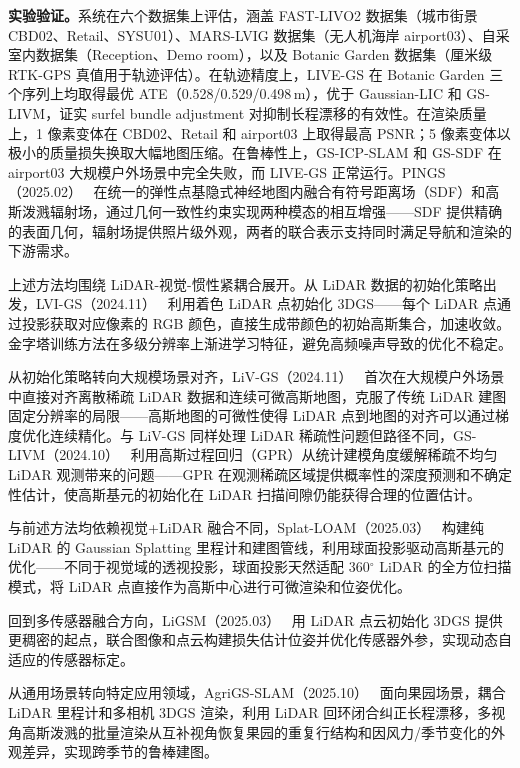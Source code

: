 \textbf{实验验证。}系统在六个数据集上评估，涵盖 FAST-LIVO2 数据集（城市街景 CBD02、Retail、SYSU01）、MARS-LVIG 数据集（无人机海岸 airport03）、自采室内数据集（Reception、Demo room），以及 Botanic Garden 数据集（厘米级 RTK-GPS 真值用于轨迹评估）。在轨迹精度上，LIVE-GS 在 Botanic Garden 三个序列上均取得最优 ATE（0.528/0.529/0.498\,m），优于 Gaussian-LIC 和 GS-LIVM，证实 surfel bundle adjustment 对抑制长程漂移的有效性。在渲染质量上，1 像素变体在 CBD02、Retail 和 airport03 上取得最高 PSNR；5 像素变体以极小的质量损失换取大幅地图压缩。在鲁棒性上，GS-ICP-SLAM 和 GS-SDF 在 airport03 大规模户外场景中完全失败，而 LIVE-GS 正常运行。PINGS（2025.02）~\cite{2502_05752} 在统一的弹性点基隐式神经地图内融合有符号距离场（SDF）和高斯泼溅辐射场，通过几何一致性约束实现两种模态的相互增强——SDF 提供精确的表面几何，辐射场提供照片级外观，两者的联合表示支持同时满足导航和渲染的下游需求。

上述方法均围绕 LiDAR-视觉-惯性紧耦合展开。从 LiDAR 数据的初始化策略出发，LVI-GS（2024.11）~\cite{2411_02703} 利用着色 LiDAR 点初始化 3DGS——每个 LiDAR 点通过投影获取对应像素的 RGB 颜色，直接生成带颜色的初始高斯集合，加速收敛。金字塔训练方法在多级分辨率上渐进学习特征，避免高频噪声导致的优化不稳定。

从初始化策略转向大规模场景对齐，LiV-GS（2024.11）~\cite{2411_12185} 首次在大规模户外场景中直接对齐离散稀疏 LiDAR 数据和连续可微高斯地图，克服了传统 LiDAR 建图固定分辨率的局限——高斯地图的可微性使得 LiDAR 点到地图的对齐可以通过梯度优化连续精化。与 LiV-GS 同样处理 LiDAR 稀疏性问题但路径不同，GS-LIVM（2024.10）~\cite{2410_17084} 利用高斯过程回归（GPR）从统计建模角度缓解稀疏不均匀 LiDAR 观测带来的问题——GPR 在观测稀疏区域提供概率性的深度预测和不确定性估计，使高斯基元的初始化在 LiDAR 扫描间隙仍能获得合理的位置估计。

与前述方法均依赖视觉+LiDAR 融合不同，Splat-LOAM（2025.03）~\cite{2503_17491} 构建纯 LiDAR 的 Gaussian Splatting 里程计和建图管线，利用球面投影驱动高斯基元的优化——不同于视觉域的透视投影，球面投影天然适配 360$^\circ$ LiDAR 的全方位扫描模式，将 LiDAR 点直接作为高斯中心进行可微渲染和位姿优化。

回到多传感器融合方向，LiGSM（2025.03）~\cite{2503_05425} 用 LiDAR 点云初始化 3DGS 提供更稠密的起点，联合图像和点云构建损失估计位姿并优化传感器外参，实现动态自适应的传感器标定。

从通用场景转向特定应用领域，AgriGS-SLAM（2025.10）~\cite{2510_26358} 面向果园场景，耦合 LiDAR 里程计和多相机 3DGS 渲染，利用 LiDAR 回环闭合纠正长程漂移，多视角高斯泼溅的批量渲染从互补视角恢复果园的重复行结构和因风力/季节变化的外观差异，实现跨季节的鲁棒建图。

